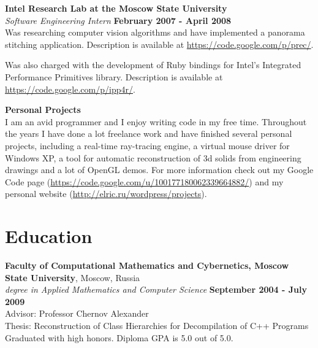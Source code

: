 \documentclass[margin,line]{CV}
\begin{document}
\begin{resume}
    \pagebreak    

   
    \textbf{Intel Research Lab at the Moscow State University} \vspace{2mm}\\\vspace{1mm}%
    \textsl{Software Engineering Intern} \hfill \textbf{February 2007 - April 2008}\\
    Was researching computer vision algorithms and have implemented a panorama stitching application. Description is available at \url{https://code.google.com/p/prec/}.

    Was also charged with the development of Ruby bindings for Intel's Integrated Performance Primitives library. Description is available at \url{https://code.google.com/p/ipp4r/}.
    
    
	\textbf{Personal Projects} \vspace{2mm}\\\vspace{1mm}%
    I am an avid programmer and I enjoy writing code in my free time. Throughout the years I have done a lot freelance work and have finished several personal projects, including a real-time ray-tracing engine, a virtual mouse driver for Windows XP, a tool for automatic reconstruction of 3d solids from engineering drawings and a lot of OpenGL demos. For more information check out my Google Code page (\url{https://code.google.com/u/100177180062339664882/}) and my personal website (\url{http://elric.ru/wordpress/projects}).
   
    
    \section{\mysidestyle Education}
    \textbf{Faculty of Computational Mathematics and Cybernetics, Moscow State University}, Moscow, Russia \vspace{2mm}\\\vspace{1mm}%
    \textsl{ degree in Applied Mathematics and Computer Science} \hfill \textbf{September 2004 - July 2009}\vspace{1mm}\\
    Advisor: Professor Chernov Alexander \\
    Thesis: Reconstruction of Class Hierarchies for Decompilation of C++ Programs \\
    Graduated with high honors. Diploma GPA is 5.0 out of 5.0.


\end{resume}
\end{document}
